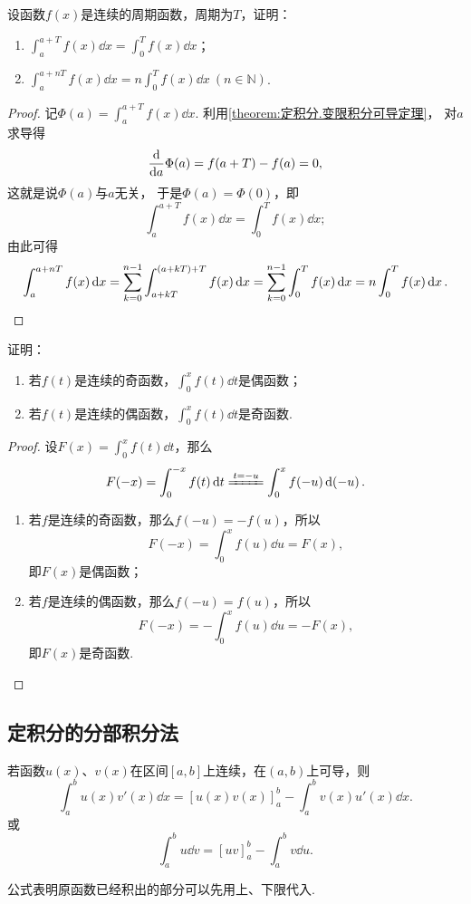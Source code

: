 \begin{example}
设函数\(f(x)\)是连续的周期函数，周期为\(T\)，证明：
\begin{enumerate}
	\item \(\int_a^{a+T} f(x) \dd{x} = \int_0^T f(x) \dd{x}\)；
	\item \(\int_a^{a+nT} f(x)\dd{x} = n\int_0^T f(x)\dd{x}\ (n \in \mathbb{N})\).
\end{enumerate}
\begin{proof}
记\(\Phi(a) = \int_a^{a+T} f(x) \dd{x}\).
利用\cref{theorem:定积分.变限积分可导定理}，
对\(a\)求导得\[
	\dv{a} \Phi(a) = f(a+T) - f(a) = 0,
\]
这就是说\(\Phi(a)\)与\(a\)无关，
于是\(\Phi(a) = \Phi(0)\)，即\[
	\int_a^{a+T} f(x) \dd{x} = \int_0^T f(x) \dd{x};
\]
由此可得\[
	\int_a^{a+nT} f(x)\dd{x}
	= \sum\limits_{k=0}^{n-1} \int_{a+kT}^{(a+kT)+T} f(x) \dd{x}
	= \sum\limits_{k=0}^{n-1} \int_0^T f(x) \dd{x}
	= n \int_0^T f(x) \dd{x}.
	\qedhere
\]
\end{proof}
\end{example}

\begin{example}
证明：\begin{enumerate}
\item 若\(f(t)\)是连续的奇函数，\(\int_0^x f(t) \dd{t}\)是偶函数；
\item 若\(f(t)\)是连续的偶函数，\(\int_0^x f(t) \dd{t}\)是奇函数.
\end{enumerate}
\begin{proof}
设\(F(x) = \int_0^x f(t) \dd{t}\)，那么\[
F(-x) = \int_0^{-x} f(t) \dd{t}
\xlongequal{t=-u} \int_0^x f(-u) \dd(-u).
\]
\begin{enumerate}
\item 若\(f\)是连续的奇函数，那么\(f(-u) = -f(u)\)，所以\[
F(-x) = \int_0^x f(u) \dd{u} = F(x),
\]即\(F(x)\)是偶函数；

\item 若\(f\)是连续的偶函数，那么\(f(-u) = f(u)\)，所以\[
F(-x) = -\int_0^x f(u) \dd{u} = -F(x),
\]即\(F(x)\)是奇函数.
\qedhere
\end{enumerate}
\end{proof}
\end{example}

\subsection{定积分的分部积分法}
\begin{theorem}
若函数\(u(x)\)、\(v(x)\)在区间\([a,b]\)上连续，在\((a,b)\)上可导，则\[
\int_a^b u(x) v'(x) \dd{x} = [u(x) v(x)]_a^b - \int_a^b v(x) u'(x) \dd{x}.
\]或\[
\int_a^b u \dd{v} = [uv]_a^b - \int_a^b v \dd{u}.
\]
\end{theorem}
公式表明原函数已经积出的部分可以先用上、下限代入.

